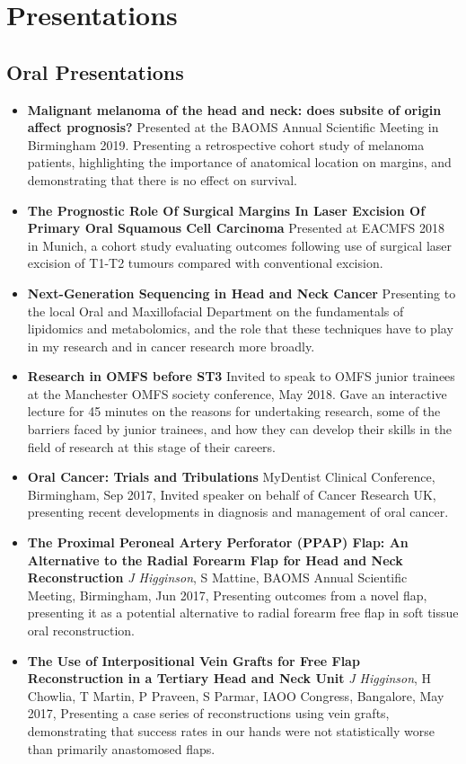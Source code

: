 \section{Presentations}
\subsection{Oral Presentations}
\begin{itemize}
	\item\textbf{Malignant melanoma of the head and neck: does subsite of origin affect prognosis?} Presented at the BAOMS Annual Scientific Meeting in Birmingham 2019. Presenting a retrospective cohort study of melanoma patients, highlighting the importance of anatomical location on margins, and demonstrating that there is no effect on survival.
        \item\textbf{The Prognostic Role Of Surgical Margins In Laser Excision Of Primary Oral Squamous Cell Carcinoma} Presented at EACMFS 2018 in Munich, a cohort study evaluating outcomes following use of surgical laser excision of T1-T2 tumours compared with conventional excision.
        \item\textbf{Next-Generation Sequencing in Head and Neck Cancer} Presenting to the local Oral and Maxillofacial Department on the fundamentals of lipidomics and metabolomics, and the role that these techniques have to play in my research and in cancer research more broadly.
        \item\textbf{Research in OMFS before ST3} Invited to speak to OMFS junior trainees at the Manchester OMFS society conference, May 2018. Gave an interactive lecture for 45 minutes on the reasons for undertaking research, some of the barriers faced by junior trainees, and how they can develop their skills in the field of research at this stage of their careers.
        \item\textbf{Oral Cancer: Trials and Tribulations} MyDentist Clinical Conference, Birmingham, Sep 2017, Invited speaker on behalf of Cancer Research UK, presenting recent developments in diagnosis and management of oral cancer.
        \item\textbf{The Proximal Peroneal Artery Perforator (PPAP) Flap: An Alternative to the Radial Forearm Flap for Head and Neck Reconstruction} \emph{J Higginson}, S Mattine, BAOMS Annual Scientific Meeting, Birmingham, Jun 2017, Presenting outcomes from a novel flap, presenting it as a potential alternative to radial forearm free flap in soft tissue oral reconstruction.
        \item\textbf{The Use of Interpositional Vein Grafts for Free Flap Reconstruction in a Tertiary Head and Neck Unit} \emph{J Higginson}, H Chowlia, T Martin, P Praveen, S Parmar, IAOO Congress, Bangalore, May 2017, Presenting a case series of reconstructions using vein grafts, demonstrating that success rates in our hands were not statistically worse than primarily anastomosed flaps.

\end{itemize}
